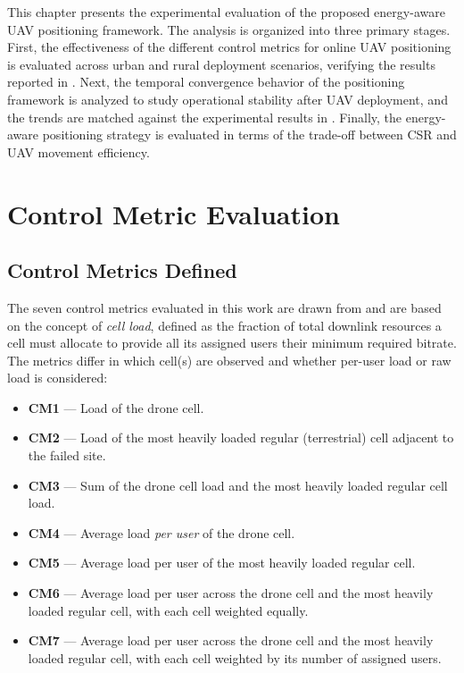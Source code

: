 \documentclass[12pt]{report}
\begin{document}
This chapter presents the experimental evaluation of the proposed energy-aware UAV positioning framework. The analysis is organized into three primary stages. First, the effectiveness of the different control metrics for online UAV positioning is evaluated across urban and rural deployment scenarios, verifying the results reported in \cite{pijnappel2024online}. Next, the temporal convergence behavior of the positioning framework is analyzed to study operational stability after UAV deployment, and the trends are matched against the experimental results in \cite{pijnappel2024online}. Finally, the energy-aware positioning strategy is evaluated in terms of the trade-off between CSR and UAV movement efficiency.

\section{Control Metric Evaluation}
\label{sec:cm_eval}

\subsection{Control Metrics Defined}

The seven control metrics evaluated in this work are drawn from \cite{pijnappel2024online} and are based on the concept of \textit{cell load}, defined as the fraction of total downlink resources a cell must allocate to provide all its assigned users their minimum required bitrate. The metrics differ in which cell(s) are observed and whether per-user load or raw load is considered:

\begin{itemize}
    \item \textbf{CM1} --- Load of the drone cell.
    \item \textbf{CM2} --- Load of the most heavily loaded regular (terrestrial) cell adjacent to the failed site.
    \item \textbf{CM3} --- Sum of the drone cell load and the most heavily loaded regular cell load.
    \item \textbf{CM4} --- Average load \emph{per user} of the drone cell.
    \item \textbf{CM5} --- Average load per user of the most heavily loaded regular cell.
    \item \textbf{CM6} --- Average load per user across the drone cell and the most heavily loaded regular cell, with each cell weighted equally.
    \item \textbf{CM7} --- Average load per user across the drone cell and the most heavily loaded regular cell, with each cell weighted by its number of assigned users.
\end{itemize}
\end{document}
